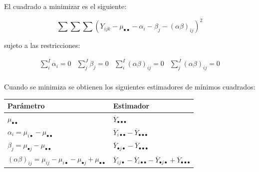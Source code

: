 \documentclass[]{book}
\theoremstyle{definition}
\theoremstyle{definition}
\theoremstyle{definition}
\theoremstyle{remark}
\begin{document}
El cuadrado a minimizar es el siguiente:

\[
\sum\sum\sum\left( Y_{ijk} - \mu_{\bullet \bullet} - \alpha_{i} - \beta_{j} - \left( \alpha\beta \right)_{ij} \right)^{2}
\]

sujeto a las restricciones:

\[
\begin{matrix}
\sum_{i}^{I}\alpha_{i} = 0 & \sum_{j}^{J}\beta_{j} = 0 & \sum_{i}^{I}\left( \alpha\beta \right)_{ij} = 0 & \sum_{j}^{J}\left( \alpha\beta \right)_{ij} = 0 \\
\end{matrix}
\]

Cuando se minimiza se obtienen los siguientes estimadores de mínimos
cuadrados:

\begin{longtable}[]{@{}ll@{}}
\toprule
\begin{minipage}[b]{0.35\columnwidth}\raggedright
Parámetro\strut
\end{minipage} & \begin{minipage}[b]{0.59\columnwidth}\raggedright
Estimador\strut
\end{minipage}\tabularnewline
\midrule
\endhead
\begin{minipage}[t]{0.35\columnwidth}\raggedright
\(\mu_{\bullet \bullet}\)\strut
\end{minipage} & \begin{minipage}[t]{0.59\columnwidth}\raggedright
\({\overline{Y}_{\bullet \bullet \bullet}}\)\strut
\end{minipage}\tabularnewline
\begin{minipage}[t]{0.35\columnwidth}\raggedright
\(\alpha_{i} = \mu_{i \bullet} - \mu_{\bullet \bullet}\)\strut
\end{minipage} & \begin{minipage}[t]{0.59\columnwidth}\raggedright
\(\overline{Y}_{i \bullet \bullet} - \overline{Y}_{\bullet \bullet \bullet}\)\strut
\end{minipage}\tabularnewline
\begin{minipage}[t]{0.35\columnwidth}\raggedright
\(\beta_{j} = \mu_{\bullet j} - \mu_{\bullet \bullet}\)\strut
\end{minipage} & \begin{minipage}[t]{0.59\columnwidth}\raggedright
\(\overline{Y}_{\bullet j \bullet} - \overline{Y}_{\bullet \bullet \bullet}\)\strut
\end{minipage}\tabularnewline
\begin{minipage}[t]{0.35\columnwidth}\raggedright
\(\left( \alpha\beta \right)_{ij} = \mu_{ij} - \mu_{i \bullet} - \mu_{\bullet j} + \mu_{\bullet \bullet}\)\strut
\end{minipage} & \begin{minipage}[t]{0.59\columnwidth}\raggedright
\(\overline{Y}_{ij \bullet} - \overline{Y}_{i \bullet \bullet} - \overline{Y}_{\bullet j \bullet} + \overline{Y}_{\bullet \bullet \bullet}\)\strut
\end{minipage}\tabularnewline
\bottomrule
\end{longtable}
\end{document}
